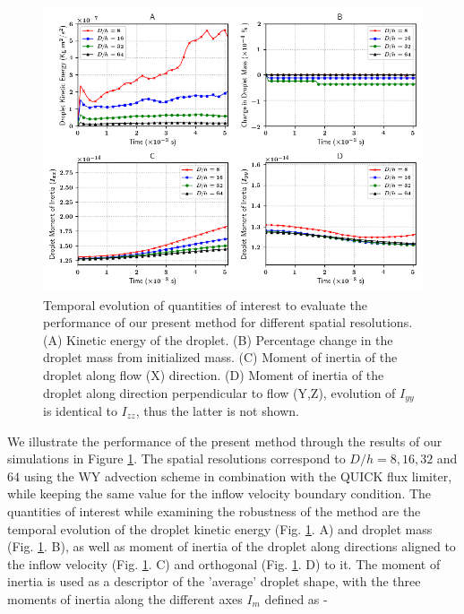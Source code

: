 \vspace*{0.2cm}

\begin{figure}[h!]
\begin{center}
\includegraphics[scale = 0.6]{Figures/Sagar/multiplot_raindrop.png}
\end{center}
\vspace*{-0.5cm}
	\caption{Temporal evolution of quantities of interest to evaluate the performance of our present method for different spatial resolutions. (A) Kinetic energy of the droplet. (B) Percentage change in the droplet mass from initialized mass. (C) Moment of inertia of the droplet along flow (X) direction. (D) Moment of inertia of the droplet along direction perpendicular to flow (Y,Z), evolution of $I_{yy}$ is identical to $I_{zz}$, thus the latter is not shown.}
\label{multi}
\end{figure}

We illustrate the performance of the present method through the results of our simulations in Figure \ref{multi}. The spatial resolutions correspond to $D/h = 8, 16, 32 $ and $64$ using the WY advection scheme in combination with the QUICK flux limiter, while keeping the same value for the inflow velocity boundary condition. The quantities of interest while examining the robustness of the method are the temporal evolution of the droplet kinetic energy (Fig. \ref{multi}. A) and droplet mass (Fig. \ref{multi}. B), as well as moment of inertia of the droplet along directions aligned to the inflow velocity (Fig. \ref{multi}. C) and orthogonal (Fig. \ref{multi}. D) to it. The moment of inertia is used as a descriptor of the 'average' droplet shape, with the three moments of inertia along the different axes $I_m$ defined as - 


